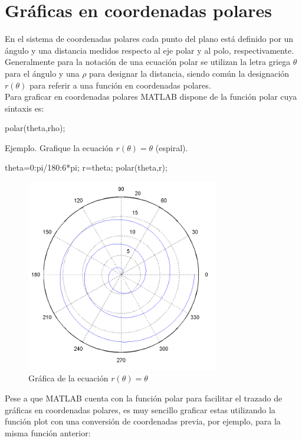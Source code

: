 \section{Gráficas en coordenadas polares}

En el sistema de coordenadas polares cada punto del plano está definido
por un ángulo y una distancia medidos respecto al eje polar y al polo,
respectivamente. Generalmente para la notación de una ecuación polar se
utilizan la letra griega $\theta$ para el ángulo y una $\rho$ 
para designar la distancia, siendo común la designación $r(\theta)$
para referir a una función en coordenadas polares. \\

Para graficar en coordenadas polares MATLAB dispone de la función polar
cuya sintaxis es:

\begin{matlab}
polar(theta,rho);
\end{matlab}

Ejemplo. Grafique la ecuación $ r(\theta) = \theta $ (espiral).

\begin{matlab}
theta=0:pi/180:6*pi;
r=theta;
polar(theta,r);
\end{matlab}

\begin{figure}[htbp]
    \centering
    \includegraphics[width=0.75\textwidth]{images/ch4/img_4_6.png}
    \caption{Gráfica de la ecuación $r(\theta) = \theta$}
    \label{fig:img_4_6}
\end{figure}

Pese a que MATLAB cuenta con la función polar para facilitar el trazado
de gráficas en coordenadas polares, es muy sencillo graficar estas
utilizando la función plot con una conversión de coordenadas previa, por
ejemplo, para la misma función anterior:


